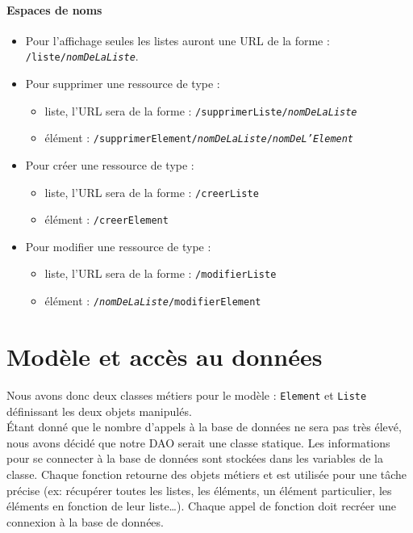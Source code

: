 \documentclass[12pt, a4paper]{article}
\begin{document}
\paragraph{Espaces de noms}
\begin{itemize}
\item  Pour l'affichage seules les listes auront une URL de la forme : \texttt{/liste/\emph{nomDeLaListe}}.
\item Pour supprimer une ressource de type :
	\begin{itemize} 
	\item liste, l'URL sera de la forme : \texttt{/supprimerListe/\emph{nomDeLaListe}}
	\item élément : \texttt{/supprimerElement/\emph{nomDeLaListe}/\emph{nomDeL'Element}}
	\end{itemize}
\item Pour créer une ressource de type :
	\begin{itemize} 
	\item liste, l'URL sera de la forme : \texttt{/creerListe}
	\item élément : \texttt{/creerElement}
	\end{itemize}
\item Pour modifier une ressource de type :
	\begin{itemize} 
	\item liste, l'URL sera de la forme : \texttt{/modifierListe}
	\item élément : \texttt{/\emph{nomDeLaListe}/modifierElement}
	\end{itemize}

\end{itemize}

\section{Modèle et accès au données}

Nous avons donc deux classes métiers pour le modèle : \verb|Element| et \verb|Liste| définissant les deux objets manipulés.\\ 

Étant donné que le nombre d'appels à la base de données ne sera pas très élevé, nous avons décidé que notre DAO serait une classe statique. Les informations pour se connecter à la base de données sont stockées dans les variables de la classe. Chaque fonction retourne des objets métiers et est utilisée pour une tâche précise (ex: récupérer toutes les listes, les éléments, un élément particulier, les éléments en fonction de leur liste\dots). Chaque appel de fonction doit recréer une connexion à la base de données.
\end{document}

